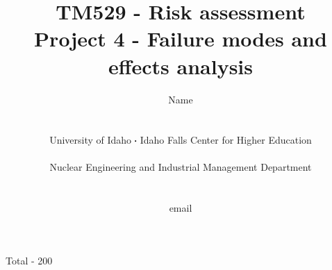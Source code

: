 \documentclass[11pt,a4paper]{article}
\newcommand*\sq{\mathbin{\vcenter{\hbox{\rule{.3ex}{.3ex}}}}} %
\begin{document}
\begin{titlepage}
    \title{
        TM529 - Risk assessment\\
        Project 4 - Failure modes and effects analysis\\
    }
    \author{
        Name
        \\ \\ \\
        University of Idaho $\sq$ Idaho Falls Center for Higher Education
        \\ \\
        Nuclear Engineering and Industrial Management Department
        \\ \\ \\
        email 
    }
\clearpage %
\maketitle
\vspace*{\fill}
\begin{flushright}{
        Total - 200
}
\end{flushright}
\thispagestyle{empty} %
\end{titlepage}
\end{document}
